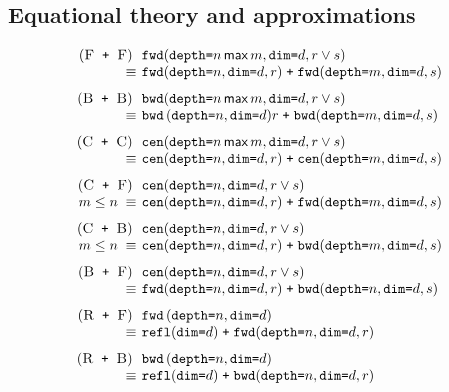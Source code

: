 \documentclass[9pt]{sigplanconf}
\theoremstyle{definition}
\newcommand{\term}[1]{\texttt{#1}}
\newcommand{\stenFwdS}[2]{\term{fwd} \, (\term{depth=}#1,
  \term{dim=}#2)}
\newcommand{\stenBwdS}[2]{\term{bwd} \, (\term{depth=}#1,
  \term{dim=}#2)}
\newcommand{\stenFwdSR}[3]{\term{fwd} (\term{depth=}#1,
  \term{dim=}#2, #3)}
\newcommand{\stenBwdSR}[3]{\term{bwd} (\term{depth=}#1,
  \term{dim=}#2, #3)}
\newcommand{\stenCenSR}[3]{\term{cen} (\term{depth=}#1,
  \term{dim=}#2, #3)}
\newcommand{\stenReflSR}[1]{\term{refl} (\term{dim=}#1)}
\begin{document}
\subsection{Equational theory and approximations}
\label{sec:eqs}

\begin{figure}
\vspace{-0.2em}
\begin{align*}
\setlength{\arraycolsep}{0.05em}
\begin{array}{c}
\begin{array}{rll}
(\textsc{F\, \texttt{+} \,F}) \;\; &
\stenFwdSR{n \, \textsf{max} \, m}{d}{r \vee s} \\
 \equiv \; & \stenFwdSR{n}{d}{r} \; \texttt{+} \; \stenFwdSR{m}{d}{s} \\[0.7em]
%
%
(\textsc{B\, \texttt{+} \,B}) \;\; &
\stenBwdSR{n \, \textsf{max} \, m}{d}{r \vee s} \\
 \equiv \; & \stenBwdS{n}{d}{r} \; \texttt{+} \; \stenBwdSR{m}{d}{s} \\[0.7em]
%
%
(\textsc{C\, \texttt{+} \,C}) \;\; &
\stenCenSR{n \, \textsf{max} \, m}{d}{r \vee s} \\
\equiv \; & \stenCenSR{n}{d}{r} \; \texttt{+} \; \stenCenSR{m}{d}{s} \\[0.7em]
%
%
(\textsc{C\, \texttt{+} \,F}) \;\; & \stenCenSR{n}{d}{r \vee s} \\
\textit{$m \leq n$} \; \equiv \; & \stenCenSR{n}{d}{r} \; \texttt{+} \;
                      \stenFwdSR{m}{d}{s} \\[0.7em]
%
%
(\textsc{C\, \texttt{+} \,B}) \;\; &
\stenCenSR{n}{d}{r \vee s} \\
\textit{$m \leq n$} \; \equiv \; & \stenCenSR{n}{d}{r} \; \texttt{+} \;
                      \stenBwdSR{m}{d}{s} \\[0.7em]
%
%
(\textsc{B\, \texttt{+} \,F}) \;\; &
\stenCenSR{n}{d}{r \vee s} \\
\equiv \; & \stenFwdSR{n}{d}{r} \; \texttt{+} \; \stenBwdSR{n}{d}{s}
  \\[0.7em]
%
%
(\textsc{R\, \texttt{+} \,F}) \;\; &
\stenFwdS{n}{d} \\
\equiv \; & \stenReflSR{d} \; \texttt{+} \; \stenFwdSR{n}{d}{r} \\[0.7em]
%
%
(\textsc{R\, \texttt{+} \,B}) \;\; &
\stenBwdS{n}{d} \\
\equiv \; & \stenReflSR{d} \; \texttt{+} \; \stenBwdSR{n}{d}{r} \\[0.7em]

\end{array}
\end{array}
\end{align*}
\end{figure}
\end{document}
